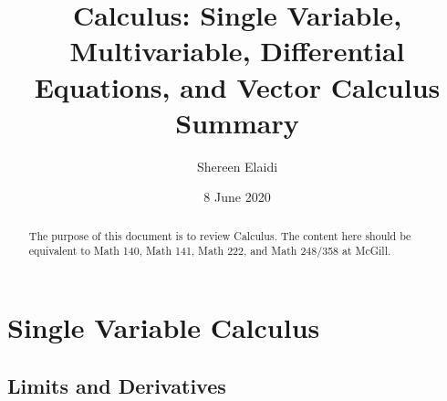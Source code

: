 \documentclass[11pt]{article}
\title{Calculus: Single Variable, Multivariable, Differential Equations, and Vector Calculus Summary}
\author{Shereen Elaidi}
\date{8 June 2020}
\begin{document}
\maketitle 

\begin{abstract}
	The purpose of this document is to review Calculus. The content here should be equivalent to Math 140, Math 141, Math 222, and Math 248/358 at McGill. 
\end{abstract}


\tableofcontents

\section{Single Variable Calculus}
\subsection{Limits and Derivatives}
\end{document}
